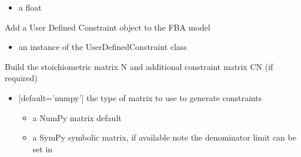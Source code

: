 \documentclass[letterpaper,10pt,english]{sphinxmanual}
\begin{document}
\begin{fulllineitems}
\begin{fulllineitems}
\begin{itemize}
\item {} 
\sphinxAtStartPar
{} a float

\end{itemize}

\end{fulllineitems}


\begin{fulllineitems}
\label{\detokenize{modules_doc:cbmpy.CBModel.Model.addUserDefinedConstraint}}
\pysigstartsignatures
{}
\pysigstopsignatures
\sphinxAtStartPar
Add a  User Defined Constraint object to the FBA model
\begin{itemize}
\item {} 
\sphinxAtStartPar
{} an instance of the UserDefinedConstraint class

\end{itemize}

\end{fulllineitems}


\begin{fulllineitems}
\label{\detokenize{modules_doc:cbmpy.CBModel.Model.buildStoichMatrix}}
\pysigstartsignatures
{}
\pysigstopsignatures
\sphinxAtStartPar
Build the stoichiometric matrix N and additional constraint matrix CN (if required)
\begin{itemize}
\item {} 
\sphinxAtStartPar
{} {[}default=’numpy’{]} the type of matrix to use to generate constraints
\begin{itemize}
\item {} 
\sphinxAtStartPar
{} a NumPy matrix default

\item {} 
\sphinxAtStartPar
{} a SymPy symbolic matrix, if available note the denominator limit can be set in 


\end{itemize}
\end{itemize}
\end{fulllineitems}
\end{fulllineitems}
\end{document}
